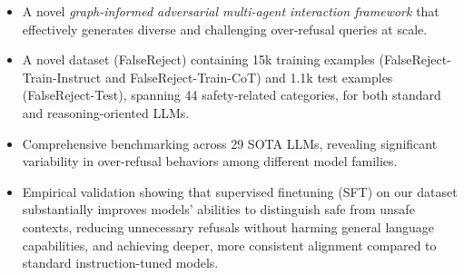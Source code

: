 \documentclass{article} %
\begin{document}
\begin{itemize}[leftmargin=*]
    \item A novel \textit{graph-informed adversarial multi-agent interaction framework} that effectively generates diverse and challenging over-refusal queries at scale.
    \item A novel dataset (FalseReject) containing 15k training examples (FalseReject-Train-Instruct and FalseReject-Train-CoT) and 1.1k test examples (FalseReject-Test), spanning 44 safety-related categories, for both standard and reasoning-oriented LLMs.
    \item Comprehensive benchmarking across 29 SOTA LLMs, revealing significant variability in over-refusal behaviors among different model families.
    \item Empirical validation showing that supervised finetuning (SFT) on our dataset substantially improves models' abilities to distinguish safe from unsafe contexts, reducing unnecessary refusals without harming general language capabilities, and achieving deeper, more consistent alignment compared to standard instruction-tuned models.
\end{itemize}
\end{document}
